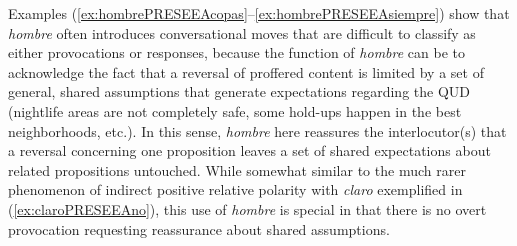 
Examples (\ref{ex:hombrePRESEEAcopas}--\ref{ex:hombrePRESEEAsiempre}) show that \textit{hombre} often introduces conversational moves that are difficult to classify as either provocations or responses, because the function of \textit{hombre} can be to acknowledge the fact that a reversal of proffered content is limited by a set of general, shared assumptions that generate expectations regarding the \ac{QUD} (nightlife areas are not completely safe, some hold-ups happen in the best neighborhoods, etc.). In this sense, \textit{hombre} here reassures the interlocutor(s) that a reversal concerning one proposition leaves a set of shared expectations about related propositions untouched. While somewhat similar to the much rarer phenomenon of indirect positive relative polarity with \textit{claro} exemplified in (\ref{ex:claroPRESEEAno}), this use of \textit{hombre} is special in that there is no overt provocation requesting reassurance about shared assumptions.

